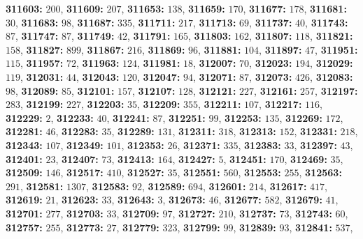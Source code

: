 \textsf{\bfseries 311603:} $200$, \textsf{\bfseries 311609:} $207$, \textsf{\bfseries 311653:} $138$, \textsf{\bfseries 311659:} $170$, \textsf{\bfseries 311677:} $178$, \textsf{\bfseries 311681:} $30$, \textsf{\bfseries 311683:} $98$, \textsf{\bfseries 311687:} $335$, \textsf{\bfseries 311711:} $217$, \textsf{\bfseries 311713:} $69$, \textsf{\bfseries 311737:} $40$, \textsf{\bfseries 311743:} $87$, \textsf{\bfseries 311747:} $87$, \textsf{\bfseries 311749:} $42$, \textsf{\bfseries 311791:} $165$, \textsf{\bfseries 311803:} $162$, \textsf{\bfseries 311807:} $118$, \textsf{\bfseries 311821:} $158$, \textsf{\bfseries 311827:} $899$, \textsf{\bfseries 311867:} $216$, \textsf{\bfseries 311869:} $96$, \textsf{\bfseries 311881:} $104$, \textsf{\bfseries 311897:} $47$, \textsf{\bfseries 311951:} $115$, \textsf{\bfseries 311957:} $72$, \textsf{\bfseries 311963:} $124$, \textsf{\bfseries 311981:} $18$, \textsf{\bfseries 312007:} $70$, \textsf{\bfseries 312023:} $194$, \textsf{\bfseries 312029:} $119$, \textsf{\bfseries 312031:} $44$, \textsf{\bfseries 312043:} $120$, \textsf{\bfseries 312047:} $94$, \textsf{\bfseries 312071:} $87$, \textsf{\bfseries 312073:} $426$, \textsf{\bfseries 312083:} $98$, \textsf{\bfseries 312089:} $85$, \textsf{\bfseries 312101:} $157$, \textsf{\bfseries 312107:} $128$, \textsf{\bfseries 312121:} $227$, \textsf{\bfseries 312161:} $257$, \textsf{\bfseries 312197:} $283$, \textsf{\bfseries 312199:} $227$, \textsf{\bfseries 312203:} $35$, \textsf{\bfseries 312209:} $355$, \textsf{\bfseries 312211:} $107$, \textsf{\bfseries 312217:} $116$, \textsf{\bfseries 312229:} $2$, \textsf{\bfseries 312233:} $40$, \textsf{\bfseries 312241:} $87$, \textsf{\bfseries 312251:} $99$, \textsf{\bfseries 312253:} $135$, \textsf{\bfseries 312269:} $172$, \textsf{\bfseries 312281:} $46$, \textsf{\bfseries 312283:} $35$, \textsf{\bfseries 312289:} $131$, \textsf{\bfseries 312311:} $318$, \textsf{\bfseries 312313:} $152$, \textsf{\bfseries 312331:} $218$, \textsf{\bfseries 312343:} $107$, \textsf{\bfseries 312349:} $101$, \textsf{\bfseries 312353:} $26$, \textsf{\bfseries 312371:} $335$, \textsf{\bfseries 312383:} $33$, \textsf{\bfseries 312397:} $43$, \textsf{\bfseries 312401:} $23$, \textsf{\bfseries 312407:} $73$, \textsf{\bfseries 312413:} $164$, \textsf{\bfseries 312427:} $5$, \textsf{\bfseries 312451:} $170$, \textsf{\bfseries 312469:} $35$, \textsf{\bfseries 312509:} $146$, \textsf{\bfseries 312517:} $410$, \textsf{\bfseries 312527:} $35$, \textsf{\bfseries 312551:} $560$, \textsf{\bfseries 312553:} $255$, \textsf{\bfseries 312563:} $291$, \textsf{\bfseries 312581:} $1307$, \textsf{\bfseries 312583:} $92$, \textsf{\bfseries 312589:} $694$, \textsf{\bfseries 312601:} $214$, \textsf{\bfseries 312617:} $417$, \textsf{\bfseries 312619:} $21$, \textsf{\bfseries 312623:} $33$, \textsf{\bfseries 312643:} $3$, \textsf{\bfseries 312673:} $46$, \textsf{\bfseries 312677:} $582$, \textsf{\bfseries 312679:} $41$, \textsf{\bfseries 312701:} $277$, \textsf{\bfseries 312703:} $33$, \textsf{\bfseries 312709:} $97$, \textsf{\bfseries 312727:} $210$, \textsf{\bfseries 312737:} $73$, \textsf{\bfseries 312743:} $60$, \textsf{\bfseries 312757:} $255$, \textsf{\bfseries 312773:} $27$, \textsf{\bfseries 312779:} $323$, \textsf{\bfseries 312799:} $99$, \textsf{\bfseries 312839:} $93$, \textsf{\bfseries 312841:} $537$, 
